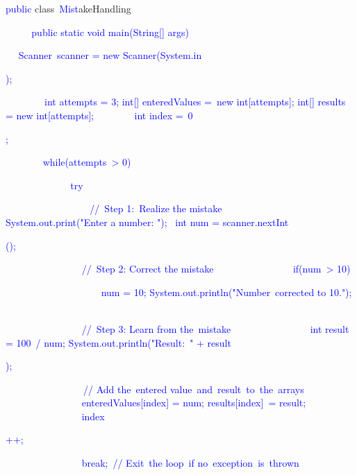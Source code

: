 \documentclass{article}
\begin{document}
\begin{tcolorbox}[colframe=black,colback=white]
{}\textcolor{blue}{public} class\textcolor{blue}{~Mist}akeHandling\textcolor{blue}{~{
}\textcolor{blue}{~~~} public static void main(String[] args)\textcolor{blue}{~{
}       \textcolor{blue}{~Scanner}\textcolor{blue}{~scanner} = new Scanner(System.in\textcolor{blue}{);

}\textcolor{blue}{~~~~~~~}\textcolor{blue}{~int} attempts = \textcolor{blue}{3}\textcolor{blue}{;
}        int[] entered\textcolor{blue}{Values} =\textcolor{blue}{~new} int\textcolor{blue}{[at}tempts];
        int[] results = new int[attempts];
\textcolor{blue}{~~~~~~~} int index =\textcolor{blue}{~}0\textcolor{blue}{;

}\textcolor{blue}{~~~~~~~} while(attempts\textcolor{blue}{~>} 0\textcolor{blue}{)}\textcolor{blue}{~{
}\textcolor{blue}{~~~~~~~~~~~} try\textcolor{blue}{~{
}\textcolor{blue}{~~~~~~~~~~~~~~~} //\textcolor{blue}{~Step} 1\textcolor{blue}{:}\textcolor{blue}{~Real}ize the mistake\textcolor{blue}{
}\textcolor{blue}{~~~~~~~~~~~~~~~} System.out.print("Enter a number: ");
               \textcolor{blue}{~int} num = scanner.nextInt\textcolor{blue}{();

}\textcolor{blue}{~~~~~~~~~~~~~~~} //\textcolor{blue}{~Step} 2: Correct the mistake
\textcolor{blue}{~~~~~~~~~~~~~~~} if\textcolor{blue}{(num}\textcolor{blue}{~>} \textcolor{blue}{10}\textcolor{blue}{)} {
\textcolor{blue}{~~~~~~~~~~~~~~~~~~~} num = 10;
                    System.out\textcolor{blue}{.println}("Number\textcolor{blue}{~corrected} to 10\textcolor{blue}{.");
}               \textcolor{blue}{~}

}\textcolor{blue}{~~~~~~~~~~~~~~~} //\textcolor{blue}{~Step} 3: Learn from the\textcolor{blue}{~mistake}
\textcolor{blue}{~~~~~~~~~~~~~~~} int result = 100\textcolor{blue}{~/} num;
                System.out.println("Result:\textcolor{blue}{~"} + result\textcolor{blue}{);

}\textcolor{blue}{~~~~~~~~~~~~~~~}\textcolor{blue}{~//} Add the\textcolor{blue}{~entered} value\textcolor{blue}{~and}\textcolor{blue}{~result}\textcolor{blue}{~to}\textcolor{blue}{~the}\textcolor{blue}{~arrays}\textcolor{blue}{
}\textcolor{blue}{~~~~~~~~~~~~~~~} enteredValues\textcolor{blue}{[index}\textcolor{blue}{]} = num\textcolor{blue}{;
}                results[index\textcolor{blue}{]}\textcolor{blue}{~=} result;
\textcolor{blue}{~~~~~~~~~~~~~~~} index\textcolor{blue}{++;

}\textcolor{blue}{~~~~~~~~~~~~~~~} break;\textcolor{blue}{~//} Exit\textcolor{blue}{~the} loop\textcolor{blue}{~if} no\textcolor{blue}{~exception}\textcolor{blue}{~is}\textcolor{blue}{~thrown}\textcolor{blue}{

}}}}}
\end{tcolorbox}
\end{document}
